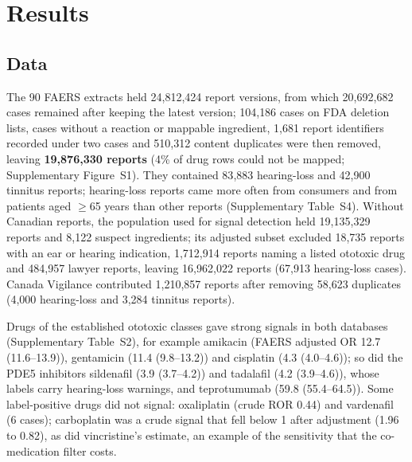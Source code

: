
\section{Results}

\subsection{Data}
The 90 FAERS extracts held 24{,}812{,}424 report versions, from which 20{,}692{,}682
cases remained after keeping the latest version; 104{,}186 cases on FDA deletion lists, cases without a
reaction or mappable ingredient, 1{,}681 report identifiers recorded under two cases and
510{,}312 content duplicates were then removed, leaving \textbf{19{,}876{,}330
reports} (4\% of drug rows could not be mapped; Supplementary Figure~S1). They contained
83{,}883 hearing-loss and 42{,}900 tinnitus reports; hearing-loss reports
came more often from consumers and from patients aged $\geq$65 years than other reports (Supplementary Table~S4). Without
Canadian reports, the population used for signal detection held 19{,}135{,}329 reports and 8{,}122 suspect
ingredients; its adjusted subset excluded 18{,}735 reports with an ear or hearing indication,
1{,}712{,}914 reports naming a listed ototoxic drug and 484{,}957 lawyer reports,
leaving 16{,}962{,}022 reports (67{,}913 hearing-loss cases). Canada Vigilance
contributed 1{,}210{,}857 reports after removing 58{,}623 duplicates
(4{,}000 hearing-loss and 3{,}284 tinnitus reports).

Drugs of the established ototoxic classes gave strong signals in both databases (Supplementary Table~S2), for example
amikacin (FAERS adjusted OR 12.7 (11.6--13.9)), gentamicin (11.4 (9.8--13.2)) and cisplatin (4.3 (4.0--4.6)); so did
the PDE5 inhibitors sildenafil (3.9 (3.7--4.2)) and tadalafil (4.2 (3.9--4.6)), whose labels carry hearing-loss
warnings, and teprotumumab (59.8 (55.4--64.5)). Some label-positive drugs did not signal: oxaliplatin (crude ROR
0.44) and vardenafil (6 cases); carboplatin was a
crude signal that fell below 1 after adjustment (1.96 to
0.82), as did vincristine's estimate, an example of the sensitivity that the
co-medication filter costs.

